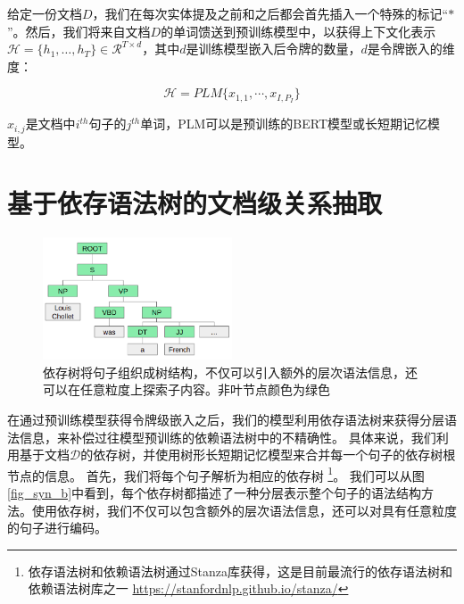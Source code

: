 \documentclass[bachelor]{thesis-uestc}
\begin{document}
给定一份文档$D$，我们在每次实体提及之前和之后都会首先插入一个特殊的标记“$*$”\cite{zhang-etal-2017-position}。然后，我们将来自文档$D$的单词馈送到预训练模型中，以获得上下文化表示 $\mathcal{H}=\{h_1, \dots, h_T\} \in \mathcal{R}^{T \times d}$，其中$d$是训练模型嵌入后令牌的数量，$d$是令牌嵌入的维度：

\begin{equation}
    \mathcal{H} = PLM \{x_{1,1},\cdots, x_{I,P_I}\}
\end{equation}\label{PLM}

$x_{i, j}$是文档中$i^{th}$句子的$j^{th}$单词，PLM可以是预训练的BERT模型\cite{BERT}或长短期记忆模型。

\section{基于依存语法树的文档级关系抽取}

\begin{figure}[t]
    \includegraphics[width=0.5\textwidth]{misc/constituency.png}
    \caption{依存树将句子组织成树结构，不仅可以引入额外的层次语法信息，还可以在任意粒度上探索子内容。非叶节点颜色为绿色} 
\end{figure}\label{fig_syn_b}


在通过预训练模型获得令牌级嵌入之后，我们的模型利用依存语法树来获得分层语法信息，来补偿过往模型预训练的依赖语法树中的不精确性。
具体来说，我们利用基于文档$\mathcal{D}$的依存树，并使用树形长短期记忆模型\cite{miwa-bansal-2016-end, duan-etal-2022-just}来合并每一个句子的依存树根节点的信息。
首先，我们将每个句子解析为相应的依存树 \footnote{依存语法树和依赖语法树通过Stanza库获得，这是目前最流行的依存语法树和依赖语法树库之一 \href{https://stanfordnlp.github.io/stanza/} { https://stanfordnlp.github.io/stanza/}}。
我们可以从图\ref{fig_syn_b}中看到，每个依存树都描述了一种分层表示整个句子的语法结构方法。使用依存树，我们不仅可以包含额外的层次语法信息，还可以对具有任意粒度的句子进行编码。\par
\end{document}
